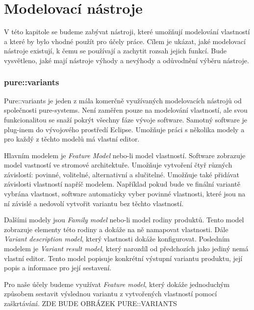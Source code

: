 \chapter{Modelovací nástroje}

V této kapitole se budeme zabývat nástroji, které umožňují modelování vlastností a které by bylo vhodné použít pro účely práce. Cílem je ukázat, jaké modelovací nástroje existují, k čemu se používají a zachytit rozsah jejich funkcí. Bude vysvětleno, jaké mají nástroje výhody a nevýhody a odůvodnění výběru nástroje.

\subsection{pure::variants}

Pure::variants je jeden z mála komerčně využívaných modelovacích nástrojů od společnosti pure-systems. Není zaměřen pouze na modelování vlastností, ale svou funkcionalitou se snaží pokrýt všechny fáze vývoje software. Samotný software je plug-inem do vývojového prostředí Eclipse. Umožňuje práci s několika modely a pro každý z těchto modelů má vlastní editor.

Hlavním modelem je \textit{Feature Model} nebo-li model vlastností. Software zobrazuje model vastností ve stromové architektuře. Umožňuje vytvoření čtyř různých závislostí: povinné, volitelné, alternativní a slučitelné. Umožňuje také přidávat závislosti vlastností napříč modelem. Například pokud bude ve finální variantě vybrána vlastnost, software automaticky vyber povinné vlastnosti, které jsou na ní závislé a nedovolí vytvořit variantu bez těchto vlastností. 

Dalšími modely jsou \textit{Family model} nebo-li model rodiny produktů. Tento model zobrazuje elementy této rodiny a dokáže na ně namapovat vlastnosti. Dále \textit{Variant description model}, který vlastnosti dokáže konfigurovat. Posledním modelem je \textit{Variant result model}, který narozdíl od předchozích jako jediný nemá vlastní editor. Tento model popisuje konkrétní výstupní variantu produktu, její popis a informace pro její sestavení.

Pro naše účely budeme využívat \textit{Feature model}, který dokáže jednoduchým způsobem sestavit výslednou variantu z vytvořených vlastností pomocí zaškrtávání. 
\newline
\newline
ZDE BUDE OBRÁZEK PURE::VARIANTS
\newline
\newline

